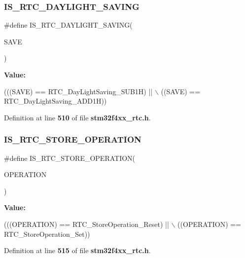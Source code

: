 \subsubsection{I\+S\+\_\+\+R\+T\+C\+\_\+\+D\+A\+Y\+L\+I\+G\+H\+T\+\_\+\+S\+A\+V\+I\+NG}
{\footnotesize\ttfamily \#define I\+S\+\_\+\+R\+T\+C\+\_\+\+D\+A\+Y\+L\+I\+G\+H\+T\+\_\+\+S\+A\+V\+I\+NG(\begin{DoxyParamCaption}\item[{}]{S\+A\+VE }\end{DoxyParamCaption})}

{\bfseries Value\+:}
\begin{DoxyCode}
(((SAVE) == RTC_DayLightSaving_SUB1H) || \(\backslash\)
                                      ((SAVE) == RTC_DayLightSaving_ADD1H))
\end{DoxyCode}


Definition at line \textbf{ 510} of file \textbf{ stm32f4xx\+\_\+rtc.\+h}.

\mbox{\label{group__RTC__DayLightSaving__Definitions_ga550da5c8a2382badcb391507fd6f07f4}} 
\subsubsection{I\+S\+\_\+\+R\+T\+C\+\_\+\+S\+T\+O\+R\+E\+\_\+\+O\+P\+E\+R\+A\+T\+I\+ON}
{\footnotesize\ttfamily \#define I\+S\+\_\+\+R\+T\+C\+\_\+\+S\+T\+O\+R\+E\+\_\+\+O\+P\+E\+R\+A\+T\+I\+ON(\begin{DoxyParamCaption}\item[{}]{O\+P\+E\+R\+A\+T\+I\+ON }\end{DoxyParamCaption})}

{\bfseries Value\+:}
\begin{DoxyCode}
(((OPERATION) == RTC_StoreOperation_Reset) || \(\backslash\)
                                           ((OPERATION) == 
      RTC_StoreOperation_Set))
\end{DoxyCode}


Definition at line \textbf{ 515} of file \textbf{ stm32f4xx\+\_\+rtc.\+h}.

